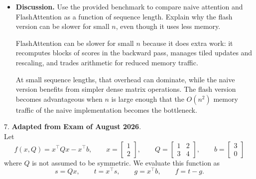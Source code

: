 \documentclass{article}
\theoremstyle{definition}
\theoremstyle{remark}
\begin{document}
\begin{itemize}
        \begin{solution}
            First compute
            \[
            D=\operatorname{rowsum}(r_0\odot O).
            \]
            Then for each tile `j`,
            \[
            S_{\mathrm{block}}=\frac{QK_{j}^\top}{\sqrt d},\qquad
            P_{\mathrm{block}}=\exp(S_{\mathrm{block}}-L),
            \]
            and update
            \[
            (r_5)_{j} \mathrel{+}= P_{\mathrm{block}}^\top r_0,
            \]
            \[
            r_{1, \mathrm{block}} = r_0\,V_{j}^\top,
            \]
            \[
            r_{2, \mathrm{block}} = P_{\mathrm{block}}\odot(r_{1, \mathrm{block}}-D),
            \]
            \[
            r_3 \mathrel{+}= \frac{r_{2, \mathrm{block}}K_{j}}{\sqrt d},\qquad
            (r_4)_{j} \mathrel{+}= \frac{r_{2, \mathrm{block}}^\top Q}{\sqrt d}.
            \]
        
            This returns the same gradients as the naive backward pass, without storing the
            full attention matrix.
        \end{solution}
    
        \item \textbf{Discussion.}
        Use the provided benchmark to compare naive attention and FlashAttention as a function of sequence length.
        Explain why the flash version can be slower for small $n$, even though it uses less memory.
        \begin{solution}
            FlashAttention can be slower for small $n$ because it does extra work:
            it recomputes blocks of scores in the backward pass, manages tiled updates and
            rescaling, and trades arithmetic for reduced memory traffic.
        
            At small sequence lengths, that overhead can dominate, while the naive version
            benefits from simpler dense matrix operations. The flash version becomes
            advantageous when $n$ is large enough that the $O(n^2)$ memory traffic of the
            naive implementation becomes the bottleneck.
        \end{solution}
    \end{itemize}

7. \textbf{Adapted from Exam of August 2026}. \vspace{0.2cm}\\
Let
\[
    f(x,Q)=x^\top Qx-x^\top b,
    \qquad
    x=\begin{bmatrix}1\\2\end{bmatrix},
    \qquad
    Q=\begin{bmatrix}1&2\\3&4\end{bmatrix},
    \qquad
    b = \begin{bmatrix}3\\0
    \end{bmatrix}
\]
where $Q$ is not assumed to be symmetric. We evaluate this function as
\[
    s=Qx, \qquad t=x^\top s, \qquad g = x^\top b, \qquad f=t-g.
\]
\end{document}
